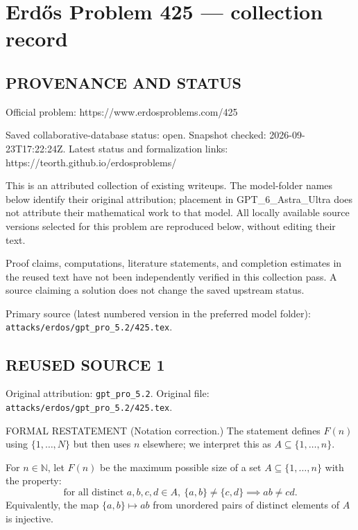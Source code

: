 \section*{Erd\H{o}s Problem 425 --- collection record}

\subsection*{PROVENANCE AND STATUS}
Official problem: https://www.erdosproblems.com/425

Saved collaborative-database status: open.
Snapshot checked: 2026-09-23T17:22:24Z.
Latest status and formalization links: https://teorth.github.io/erdosproblems/

This is an attributed collection of existing writeups. The model-folder names below identify their original attribution; placement in GPT\_6\_Astra\_Ultra does not attribute their mathematical work to that model. All locally available source versions selected for this problem are reproduced below, without editing their text.

Proof claims, computations, literature statements, and completion estimates in the reused text have not been independently verified in this collection pass. A source claiming a solution does not change the saved upstream status.

Primary source (latest numbered version in the preferred model folder): \texttt{attacks/erdos/gpt\_pro\_5.2/425.tex}.

\subsection*{REUSED SOURCE 1}
Original attribution: \texttt{gpt\_pro\_5.2}.
Original file: \texttt{attacks/erdos/gpt\_pro\_5.2/425.tex}.


FORMAL RESTATEMENT
(Notation correction.) The statement defines $F(n)$ using $\{1,\dots,N\}$ but then uses $n$ elsewhere; we interpret this as $A\subseteq\{1,\dots,n\}$.

For $n\in\mathbb N$, let $F(n)$ be the maximum possible size of a set $A\subseteq\{1,\dots,n\}$ with the property:
\[
\text{for all distinct }a,b,c,d\in A,\ \{a,b\}\ne\{c,d\}\implies ab\ne cd.
\]
Equivalently, the map $\{a,b\}\mapsto ab$ from unordered pairs of distinct elements of $A$ is injective.


